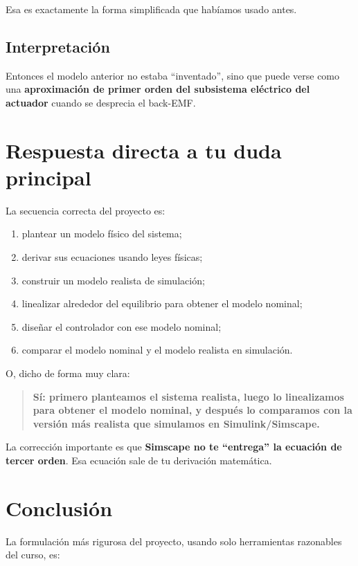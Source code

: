 \documentclass[11pt]{article}
\begin{document}
Esa es exactamente la forma simplificada que hab\'iamos usado antes.

\subsection{Interpretaci\'on}

Entonces el modelo anterior no estaba ``inventado'', sino que puede verse como una \textbf{aproximaci\'on de primer orden del subsistema el\'ectrico del actuador} cuando se desprecia el back-EMF.

\section{Respuesta directa a tu duda principal}

La secuencia correcta del proyecto es:

\begin{enumerate}[leftmargin=1.2cm]
\item plantear un modelo f\'isico del sistema;
\item derivar sus ecuaciones usando leyes f\'isicas;
\item construir un modelo realista de simulaci\'on;
\item linealizar alrededor del equilibrio para obtener el modelo nominal;
\item dise\~nar el controlador con ese modelo nominal;
\item comparar el modelo nominal y el modelo realista en simulaci\'on.
\end{enumerate}

O, dicho de forma muy clara:

\begin{quote}
\textbf{S\'i: primero planteamos el sistema realista, luego lo linealizamos para obtener el modelo nominal, y despu\'es lo comparamos con la versi\'on m\'as realista que simulamos en Simulink/Simscape.}
\end{quote}

La correcci\'on importante es que \textbf{Simscape no te ``entrega'' la ecuaci\'on de tercer orden}. Esa ecuaci\'on sale de tu derivaci\'on matem\'atica.

\section{Conclusi\'on}

La formulaci\'on m\'as rigurosa del proyecto, usando solo herramientas razonables del curso, es:
\end{document}
